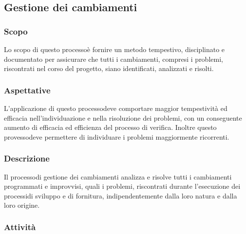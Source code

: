 \subsection{Gestione dei cambiamenti}
\subsubsection{Scopo}
Lo scopo di questo processo\glosp è fornire un metodo tempestivo, disciplinato e documentato per assicurare che tutti i cambiamenti, compresi i problemi, riscontrati nel corso del progetto\glosp, siano identificati, analizzati e risolti.
\subsubsection{Aspettative}
L'applicazione di questo processo\glosp deve comportare maggior tempestività ed efficacia nell'individuazione e nella risoluzione dei problemi, con un conseguente aumento di efficacia ed efficienza del processo di verifica. Inoltre questo provesso\glosp deve permettere di individuare i problemi maggiormente ricorrenti.
\subsubsection{Descrizione} 
Il processo\glosp di gestione dei cambiamenti analizza e risolve tutti i cambiamenti programmati e improvvisi, quali i problemi, riscontrati durante l'esecuzione dei processi\glosp di sviluppo e di fornitura, indipendentemente dalla loro natura e dalla loro origine. 
\subsubsection{Attività}
